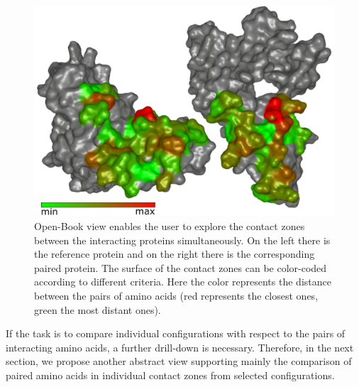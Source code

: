 \documentclass[twocolumn]{bmcart}%
\def\OpBook {Open-Book view\xspace}
\begin{document}
\begin{figure}[tb]
  \centering
  \includegraphics[width=0.9\columnwidth]{images/figure6.pdf}
   \caption{\csentence{\OpBook.} \OpBook enables the user to explore the contact zones between the interacting proteins simultaneously. On the left there is the reference protein and on the right there is the corresponding paired protein. The surface of the contact zones can be color-coded according to different criteria. Here the color represents the distance between the pairs of amino acids (red represents the closest ones, green the most distant ones).}
  \label{fig:book}
\end{figure}

If the task is to compare individual configurations with respect to the pairs of interacting amino acids, a further drill-down is necessary.
Therefore, in the next section, we propose another abstract view supporting mainly the comparison of paired amino acids in individual contact zones from selected configurations.

\end{document}
